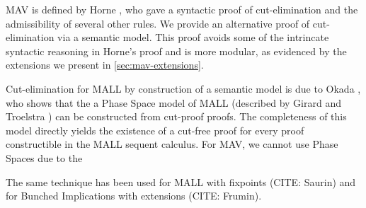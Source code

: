 MAV is defined by Horne \cite{Horne15:mav}, who gave a syntactic proof
of cut-elimination and the admissibility of several other rules. We
provide an alternative proof of cut-elimination via a semantic
model. This proof avoids some of the intrincate syntactic reasoning in
Horne's proof and is more modular, as evidenced by the extensions we
present in \autoref{sec:mav-extensions}.

Cut-elimination for MALL by construction of a semantic model is due to
Okada \cite{Okada99:psc}, who shows that the a Phase Space model of
MALL (described by Girard \cite{Girard87:ll} and Troelstra
\cite{TroelstraXX:lnll}) can be constructed from cut-proof proofs. The
completeness of this model directly yields the existence of a cut-free
proof for every proof constructible in the MALL sequent calculus. For
MAV, we cannot use Phase Spaces due to the

The same technique has been used for MALL with fixpoints (CITE:
Saurin) and for Bunched Implications with extensions (CITE: Frumin).
